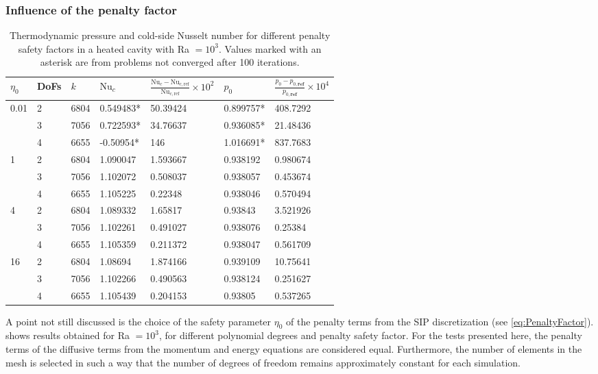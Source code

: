 \subsubsection{Influence of the penalty factor}
\begin{table}[h]
\centering
\begin{tabular}{lllllll}
	\hline \vspace{0.1cm}
		$\eta_0$                  & DoFs & $k$ & $\text{Nu}_c$ &  $\frac{\text{Nu}_c - \text{Nu}_{c,\text{ref}}} {\text{Nu}_{c,\text{ref}}}\times 10^2 $   & $p_0$    & $\frac{p_0 - p_{0,\textbf{ref}}} {p_{0,\textbf{ref} }}\times 10^4 $ \\ \hline
\multirow{3}{*}{0.01} & 2 & 6804 & 0.549483* & 50.39424 & 0.899757* & 408.7292 \\
                      & 3 & 7056 & 0.722593* & 34.76637 & 0.936085* & 21.48436 \\
                      & 4 & 6655 & -0.50954* & 146      & 1.016691* & 837.7683 \\ \hline
\multirow{3}{*}{1}    & 2 & 6804 & 1.090047 & 1.593667 & 0.938192 & 0.980674 \\
                      & 3 & 7056 & 1.102072 & 0.508037 & 0.938057 & 0.453674 \\
                      & 4 & 6655 & 1.105225 & 0.22348  & 0.938046 & 0.570494 \\ \hline
\multirow{3}{*}{4}    & 2 & 6804 & 1.089332 & 1.65817  & 0.93843  & 3.521926 \\
                      & 3 & 7056 & 1.102261 & 0.491027 & 0.938076 & 0.25384  \\
                      & 4 & 6655 & 1.105359 & 0.211372 & 0.938047 & 0.561709 \\ \hline
\multirow{3}{*}{16}   & 2 & 6804 & 1.08694  & 1.874166 & 0.939109 & 10.75641 \\
                      & 3 & 7056 & 1.102266 & 0.490563 & 0.938124 & 0.251627 \\
                      & 4 & 6655 & 1.105439 & 0.204153 & 0.93805  & 0.537265 \\ \hline
\end{tabular}
\caption[Thermodynamic pressure and cold-side Nusselt number for different penalty safety factors in a heated cavity with Ra $=10^3$.]{Thermodynamic pressure and cold-side Nusselt number for different penalty safety factors in a heated cavity with Ra $=10^3$. Values marked with an asterisk are from problems not converged after 100 iterations.} \label{fig:EtaInfluence}
\end{table}
A point not still discussed is the choice of the safety parameter $\eta_0$ of the penalty terms from the SIP discretization (see \cref{eq:PenaltyFactor}).   shows results obtained for Ra $=10^3$, for different polynomial degrees and penalty safety factor.  For the tests presented here, the penalty terms of the diffusive terms from the momentum and energy equations are considered equal. Furthermore, the number of elements in the mesh is selected in such a way that the number of degrees of freedom remains approximately constant for each simulation. 

